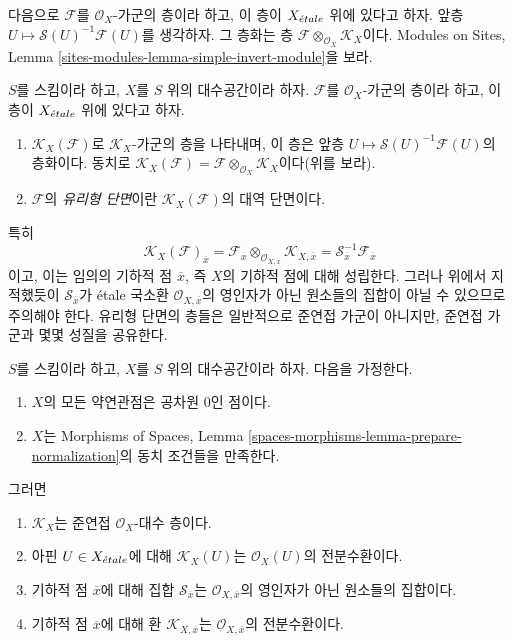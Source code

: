 \noindent
다음으로 $\mathcal{F}$를 $\mathcal{O}_X$-가군의 층이라 하고, 이 층이
$X_{\acute{e}tale}$ 위에 있다고 하자.
앞층 $U \mapsto \mathcal{S}(U)^{-1}\mathcal{F}(U)$를 생각하자. 그 층화는
층 $\mathcal{F} \otimes_{\mathcal{O}_X} \mathcal{K}_X$이다. Modules on
Sites, Lemma \ref{sites-modules-lemma-simple-invert-module}을 보라.

\begin{definition}
\label{definition-meromorphic-section}
$S$를 스킴이라 하고, $X$를 $S$ 위의 대수공간이라 하자.
$\mathcal{F}$를 $\mathcal{O}_X$-가군의 층이라 하고, 이 층이 $X_{\acute{e}tale}$
위에 있다고 하자.
\begin{enumerate}
\item $\mathcal{K}_X(\mathcal{F})$로 $\mathcal{K}_X$-가군의 층을
나타내며, 이 층은 앞층
$U \mapsto \mathcal{S}(U)^{-1}\mathcal{F}(U)$의 층화이다. 동치로
$\mathcal{K}_X(\mathcal{F}) =
\mathcal{F} \otimes_{\mathcal{O}_X} \mathcal{K}_X$이다(위를 보라).
\item $\mathcal{F}$의 {\it 유리형 단면}이란
$\mathcal{K}_X(\mathcal{F})$의 대역 단면이다.
\end{enumerate}
\end{definition}

\noindent
특히
$$
\mathcal{K}_X(\mathcal{F})_{\overline{x}}
=
\mathcal{F}_{\overline{x}}
\otimes_{\mathcal{O}_{X, \overline{x}}} \mathcal{K}_{X, \overline{x}}
=
\mathcal{S}_{\overline{x}}^{-1}\mathcal{F}_{\overline{x}}
$$
이고, 이는 임의의 기하적 점 $\overline{x}$, 즉 $X$의 기하적 점에 대해
성립한다. 그러나
위에서 지적했듯이 $\mathcal{S}_{\overline{x}}$가 \'etale 국소환
$\mathcal{O}_{X, \overline{x}}$의 영인자가 아닌 원소들의 집합이 아닐 수
있으므로 주의해야 한다. 유리형 단면의 층들은 일반적으로 준연접 가군이
아니지만, 준연접 가군과 몇몇 성질을 공유한다.

\begin{lemma}
\label{lemma-meromorphic-quasi-coherent}
$S$를 스킴이라 하고, $X$를 $S$ 위의 대수공간이라 하자. 다음을 가정한다.
\begin{enumerate}
\item[(a)] $X$의 모든 약연관점은 공차원 $0$인 점이다.
\item[(b)] $X$는 Morphisms of Spaces, Lemma
\ref{spaces-morphisms-lemma-prepare-normalization}의 동치 조건들을 만족한다.
\end{enumerate}
그러면
\begin{enumerate}
\item $\mathcal{K}_X$는 준연접 $\mathcal{O}_X$-대수 층이다.
\item 아핀 $U \in X_{\acute{e}tale}$에 대해 $\mathcal{K}_X(U)$는
$\mathcal{O}_X(U)$의 전분수환이다.
\item 기하적 점 $\overline{x}$에 대해 집합 $\mathcal{S}_{\overline{x}}$는
$\mathcal{O}_{X, \overline{x}}$의 영인자가 아닌 원소들의 집합이다.
\item 기하적 점 $\overline{x}$에 대해 환
$\mathcal{K}_{X, \overline{x}}$는 $\mathcal{O}_{X, \overline{x}}$의
전분수환이다.
\end{enumerate}
\end{lemma}

